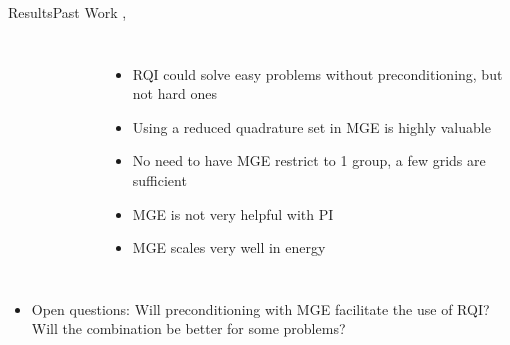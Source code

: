 \documentclass[final]{beamer}
\begin{document}
\begin{frame}{}
\begin{columns}[t]
\begin{column}{.3\linewidth}
\begin{block}{\large Results\textemdash Past Work 
		              \cite{Slaybaugh2012}, \cite{Slaybaugh2013}}
\begin{columns}
\begin{figure}[h!]
	\end{figure}
	\begin{itemize}
	\item{RQI could solve easy problems without preconditioning, but not hard ones}
	\item{Using a reduced quadrature set in MGE is highly valuable}
	\item{No need to have MGE restrict to 1 group, a few grids are sufficient}
	\item{MGE is not very helpful with PI}
	\item{MGE scales very well in energy}
	\end{itemize}
\end{columns}
	\begin{itemize}
	\item{Open questions: Will preconditioning with MGE facilitate the use of RQI? 
	      Will the combination be better for some problems?}
	\end{itemize}
		\end{block}
	\vfill
      \end{column}



\end{columns}
\end{frame}
\end{document}
